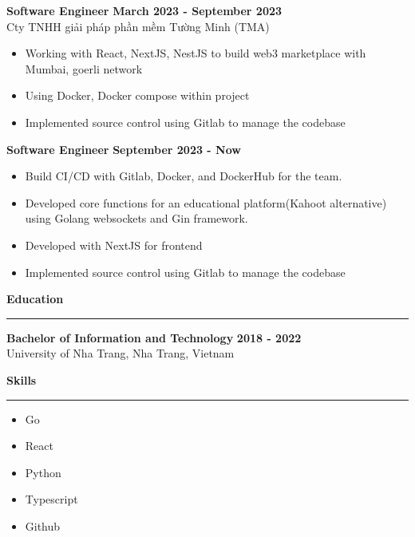 \documentclass{article}
\newcommand{\separator}{\bigskip\hrule\bigskip}
\newcommand{\goicon}{\faCode \hspace{0.1cm} Go}
\newcommand{\reacticon}{\faCode \hspace{0.1cm} React}
\newcommand{\githubicon}{\faGithub \hspace{0.1cm} Github}
\newcommand{\pythonicon}{\faCode \hspace{0.1cm} Python}
\newcommand{\typescripticon}{\faCode \hspace{0.1cm} Typescript}
\newcommand{\sectionheader}[1]{\noindent\large\textbf{#1}\separator}
\newenvironment{bullets}{
    \begin{itemize}
    \setlength{\itemsep}{0pt}
    \setlength{\parskip}{0pt}
    \setlength{\parsep}{0pt}
}{
    \end{itemize}
}
\begin{document}
\textbf{Software Engineer} \hfill \textbf{March 2023 - September 2023}\\
Cty TNHH giải pháp phần mềm Tường Minh (TMA)

\begin{bullets}
    \item Working with React, NextJS, NestJS to build web3 marketplace with Mumbai, goerli network
    \item Using Docker, Docker compose within project
    \item Implemented source control using Gitlab to manage the codebase
\end{bullets}

\textbf{Software Engineer} \hfill 
\textbf{September 2023 - Now}\\
\begin{bullets}
    \item Build CI/CD with Gitlab, Docker, and DockerHub for the team.
    \item Developed core functions for an educational platform(Kahoot alternative) using Golang websockets and Gin framework.
    \item Developed with NextJS for frontend
    \item Implemented source control using Gitlab to manage the codebase

\end{bullets}


\sectionheader{Education}

\textbf{Bachelor of Information and Technology} \hfill \textbf{2018 - 2022}\\
University of Nha Trang, Nha Trang, Vietnam

\vspace{\baselineskip}

\sectionheader{Skills}

\begin{bullets}
    \item \goicon \hspace{0.1cm}
    \item \reacticon \hspace{0.1cm}
    \item \pythonicon \hspace{0.1cm}
    \item \typescripticon \hspace{0.1cm}
    \item \githubicon \hspace{0.1cm}

\end{bullets}
\end{document}
